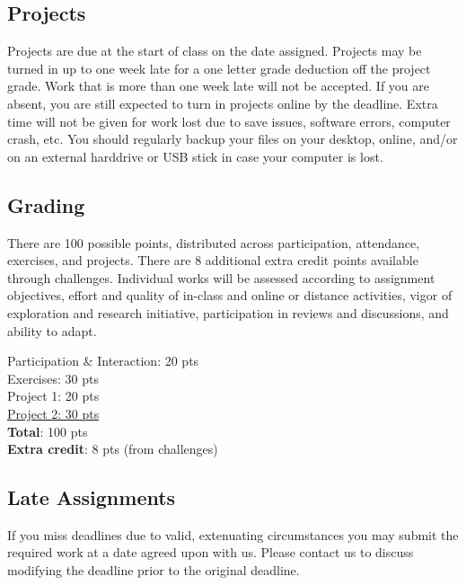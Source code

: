 \subsection{Projects}

Projects are due at the start of class on the date assigned. Projects may be turned in up to one week late for a one letter grade deduction off the project grade. Work that is more than one week late will not be accepted. If you are absent, you are still expected to turn in projects online by the deadline. Extra time will not be given for work lost due to save issues, software errors, computer crash, etc. You should regularly backup your files on your desktop, online, and/or on an external harddrive or USB stick in case your computer is lost.

\subsection{Grading}

There are 100 possible points, distributed across participation, attendance, exercises, and projects. There are 8 additional extra credit points available through challenges. Individual works will be assessed according to assignment objectives, effort and quality of in-class and online or distance activities, vigor of exploration and research initiative, participation in reviews and discussions, and ability to adapt.

\hspace*{1em} Participation \& Interaction: 20 pts\\
\hspace*{1em} Exercises: 30 pts\\
\hspace*{1em} Project 1: 20 pts\\
\hspace*{1em} \ul{Project 2: 30 pts}\\
\hspace*{1em} \textbf{Total}: 100 pts\\
\hspace*{1em} \textbf{Extra credit}: 8 pts (from challenges)

\subsection{Late Assignments}

If you miss deadlines due to valid, extenuating circumstances you may submit the required work at a date agreed upon with us. Please contact us to discuss modifying the deadline prior to the original deadline.

